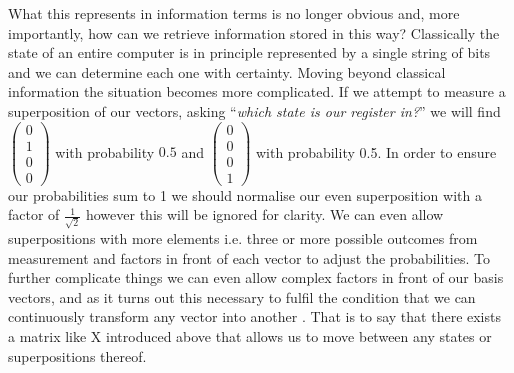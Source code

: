 What this represents in information terms is no longer obvious and, more importantly, how can we retrieve information stored in this way? Classically the state of an entire computer is in principle represented by a single string of bits and we can determine each one with certainty. Moving beyond classical information the situation becomes more complicated. If we attempt to measure a superposition of our vectors, asking ``\textit{which state is our register in?}'' we will find $\begin{pmatrix}  0 \\ 1 \\ 0 \\ 0 \end{pmatrix}$ with probability $0.5$ and $\begin{pmatrix}  0 \\ 0 \\ 0 \\ 1 \end{pmatrix}$ with probability 0.5. In order to ensure our probabilities sum to 1 we should normalise our even superposition with a factor of $\frac{1}{\sqrt{2}}$ however this will be ignored for clarity. We can even allow superpositions with more elements i.e. three or more possible outcomes from measurement and factors in front of each vector to adjust the probabilities. To further complicate things we can even allow complex factors in front of our basis vectors, and as it turns out this necessary to fulfil the condition that we can continuously transform any vector into another \cite{hardy2001quantum}. That is to say that there exists a matrix like X introduced above that allows us to move between any states or superpositions thereof. 



